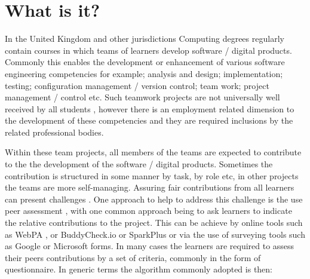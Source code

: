 \documentclass[sigconf, anonymous=true]{acmart}
\begin{document}



\maketitle

\section{What is it?}	
\label{sec:What}
In the United Kingdom and other jurisdictions Computing degrees regularly contain courses in which teams of learners develop software / digital products. Commonly this enables the development or enhancement of various software engineering competencies for example; analysis and design; implementation; testing; configuration management / version control; team work; project management / control etc. Such teamwork projects are not universally well received by all students \cite{Gordon2010}, however there is an employment related dimension \cite{Thomas2003} to the development of these competencies and they are required inclusions by the related professional bodies\cite{Crick2020}. 

Within these team projects, all members of the teams are expected to contribute to the the development of the software / digital products. Sometimes the contribution is structured in some manner by task, by role etc, in other projects the teams are more self-managing. Assuring fair contributions from all learners can present challenges \cite{Philips21}. One approach to help to address this challenge is the use peer assessment \cite{Gordon2010}, with one common approach being to ask learners to indicate the relative contributions to the project. This can be achieve by online tools such as WebPA \cite{WebPA}, or BuddyCheck.io \cite{BuddyCheck} or SparkPlus \cite{SparkPlus} or via the use of surveying tools such as Google or Microsoft forms. In many cases the learners are required to assess their peers contributions by a set of criteria, commonly in the form of questionnaire.  In generic terms the algorithm commonly adopted is then:
\end{document}
